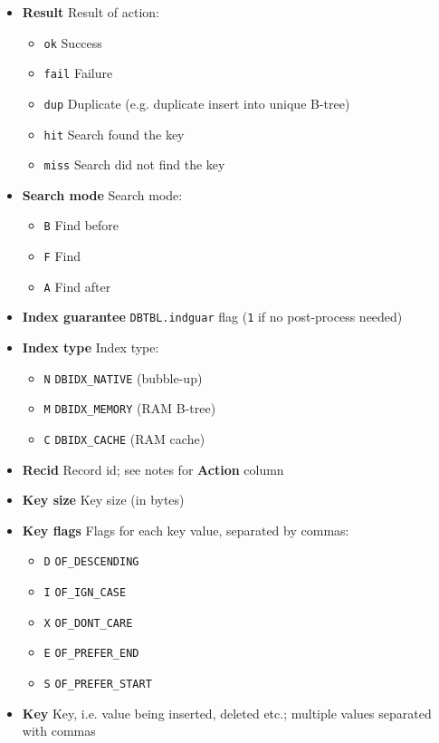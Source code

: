 \begin{description}
\begin{itemize}
\begin{itemize}
    \end{itemize}
  \item {\bf Result} Result of action:
    \begin{itemize}
      \item \verb`ok` Success
      \item \verb`fail` Failure
      \item \verb`dup` Duplicate (e.g. duplicate insert into unique B-tree)
      \item \verb`hit` Search found the key
      \item \verb`miss` Search did not find the key
    \end{itemize}
  \item {\bf Search mode} Search mode:
    \begin{itemize}
      \item \verb`B` Find before
      \item \verb`F` Find
      \item \verb`A` Find after
    \end{itemize}
  \item {\bf Index guarantee} \verb`DBTBL.indguar` flag (\verb`1` if no
    post-process needed)
  \item {\bf Index type} Index type:
    \begin{itemize}
      \item \verb`N` \verb`DBIDX_NATIVE` (bubble-up)
      \item \verb`M` \verb`DBIDX_MEMORY` (RAM B-tree)
      \item \verb`C` \verb`DBIDX_CACHE` (RAM cache)
    \end{itemize}
  \item {\bf Recid} Record id; see notes for {\bf Action} column
  \item {\bf Key size} Key size (in bytes)
  \item {\bf Key flags} Flags for each key value, separated by commas:
    \begin{itemize}
      \item \verb`D` \verb`OF_DESCENDING`
      \item \verb`I` \verb`OF_IGN_CASE`
      \item \verb`X` \verb`OF_DONT_CARE`
      \item \verb`E` \verb`OF_PREFER_END`
      \item \verb`S` \verb`OF_PREFER_START`
    \end{itemize}
  \item {\bf Key} Key, i.e. value being inserted, deleted etc.;
    multiple values separated with commas
\end{itemize}


\end{description}
